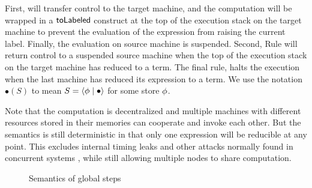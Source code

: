 First,  will transfer control to the target machine, and the computation will be wrapped in a $\mathsf{toLabeled}$ construct at the top of the execution stack on the target machine to prevent the evaluation of the expression from raising the current label. Finally, the evaluation on source machine is suspended. Second, Rule  will return control to a suspended source machine when the top of the execution stack on the target machine has reduced to a term. The final rule,  halts the execution when the last machine has reduced its expression to a term. We use the notation $\bullet(S)$ to mean $S = \langle \phi \mid \bullet \rangle$ for some store $\phi$.

Note that the computation is decentralized and multiple machines with different resources stored in their memories can cooperate and invoke each other. But the semantics is still deterministic in that only one expression will be reducible at any point. This excludes internal timing leaks and other attacks normally found in concurrent systems \cite{Smith:1998:SIF:268946.268975, Muller:2012:TPS:2384616.2384621}, while still allowing multiple nodes to share computation.

\begin{figure*}
\centering
{}
\caption{Semantics of global steps}
\label{fig:global-steps}
\end{figure*}

